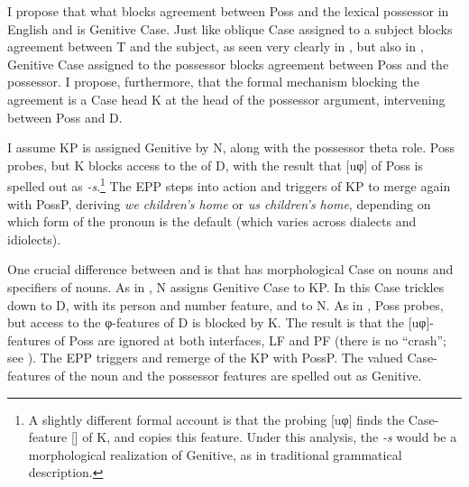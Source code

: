 \documentclass[output=paper]{langsci/langscibook}
\begin{document}
I propose that what blocks agreement between Poss and the lexical possessor in
English and  is Genitive Case. Just like oblique Case
assigned to a subject blocks agreement between T and the subject, as seen very
clearly in  \citep{Thrainsson2007}, but also in 
\parencites{LaitinenVilkuna1993}[209--210]{Holmberg2010b}, Genitive Case assigned to the possessor blocks agreement between Poss and the
possessor. I propose, furthermore, that the formal mechanism blocking the
agreement is a Case head K at the head of the possessor argument, intervening
between Poss and D.

\ea\label{ex:key:16.45}
\z

I assume KP is assigned Genitive by N, along with the possessor theta role.
Poss probes, but K blocks access to the  of D, with the result that
[uφ] of Poss is spelled out as \emph{-s}.\footnote{ A slightly different formal
account is that the probing [uφ] finds the Case-feature [\Gen{}] of K, and
copies this feature. Under this analysis, the \emph{-s} would be a
morphological realization of Genitive, as in traditional grammatical
description.} The \gls{EPP} steps into action and triggers  of KP to merge
again with PossP, deriving \emph{we children’s home} or \emph{us children’s
home}, depending on which form of the pronoun is the default (which varies
across dialects and idiolects).

One crucial difference between  and  is that  has
morphological Case on nouns and specifiers of nouns. As in , N assigns
Genitive Case to KP. In  this Case trickles down to D, with its person
and number feature, and to N. As in , Poss probes, but access to the
φ-features of D is blocked by K. The result is that the [uφ]-features of Poss
are ignored at both interfaces, LF and PF (there is no \enquote{crash}; see
\citealt{Preminger2014}). The \gls{EPP}
triggers  and remerge of the KP with PossP. The valued Case-features of
the noun and the possessor features are spelled out as Genitive.\largerpage[-2]
\end{document}
